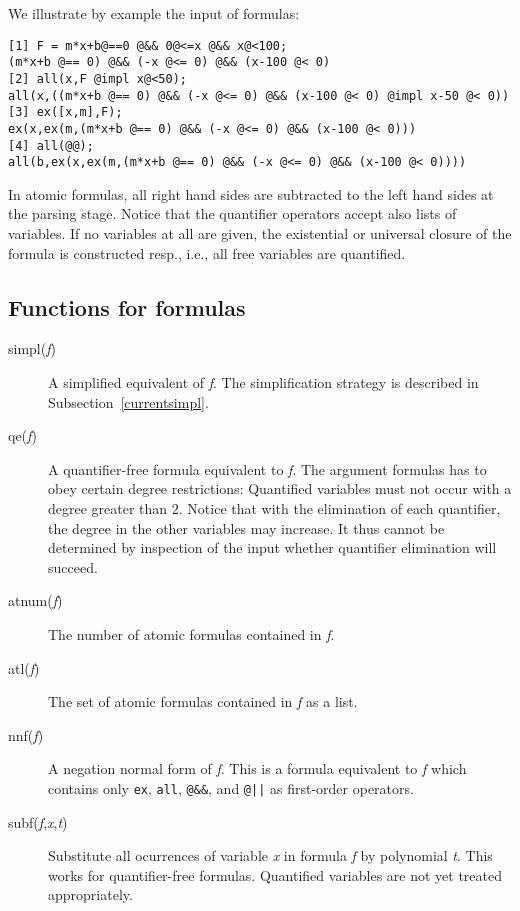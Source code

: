 \begin{appendix}
We illustrate by example the input of formulas:
\begin{small}
\begin{verbatim}
[1] F = m*x+b@==0 @&& 0@<=x @&& x@<100;
(m*x+b @== 0) @&& (-x @<= 0) @&& (x-100 @< 0)
[2] all(x,F @impl x@<50);
all(x,((m*x+b @== 0) @&& (-x @<= 0) @&& (x-100 @< 0) @impl x-50 @< 0))
[3] ex([x,m],F);
ex(x,ex(m,(m*x+b @== 0) @&& (-x @<= 0) @&& (x-100 @< 0)))
[4] all(@@);
all(b,ex(x,ex(m,(m*x+b @== 0) @&& (-x @<= 0) @&& (x-100 @< 0))))
\end{verbatim}
\end{small}
In atomic formulas, all right hand sides are subtracted to the left
hand sides at the parsing stage. Notice that the quantifier operators
accept also lists of variables. If no variables at all are given, the
existential or universal closure of the formula is constructed resp.,
i.e., all free variables are quantified.
\subsection{Functions for formulas}
\begin{description}
\item[simpl({\sl f})] A simplified equivalent of {\sl f}. The
simplification strategy is described in Subsection~\ref{currentsimpl}.
\item[qe({\sl f})] A quantifier-free formula equivalent to {\sl f}. 
The argument formulas has to obey certain degree restrictions:
Quantified variables must not occur with a degree greater than $2$. 
Notice that with the elimination of each quantifier, the degree in the
other variables may increase. It thus cannot be determined by
inspection of the input whether quantifier elimination will succeed.
\item[atnum({\sl f})] The number of atomic formulas contained in {\sl
f}.
\item[atl({\sl f})] The set of atomic formulas contained in {\sl f} as
a list.
\item[nnf({\sl f})] A negation normal form of {\sl f}. This is a
formula equivalent to {\sl f} which contains only \verb!ex!,
\verb!all!, \verb!@&&!, and \verb!@||! as first-order operators.
\item[subf({\sl f},{\sl x},{\sl t})] Substitute all ocurrences of
variable {\sl x} in formula {\sl f} by polynomial {\sl t}. This works
for quantifier-free formulas. Quantified variables are not yet treated
appropriately.
\end{description}
\end{appendix}



